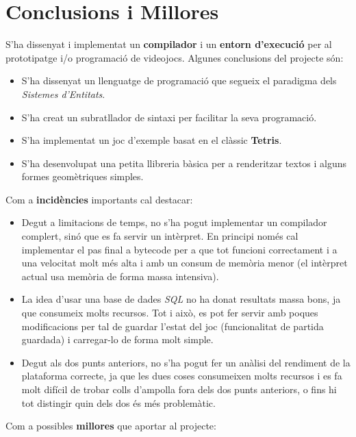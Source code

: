 \chapter{Conclusions i Millores}

S'ha dissenyat i implementat un {\bf compilador} i un {\bf entorn d'execució} per al prototipatge i/o programació de videojocs. Algunes conclusions del projecte són:

\begin{itemize}
  \item S'ha dissenyat un llenguatge de programació que segueix el paradigma dels {\em Sistemes d'Entitats}.
  \item S'ha creat un subratllador de sintaxi per facilitar la seva programació.
  \item S'ha implementat un joc d'exemple basat en el clàssic {\bf Tetris}.
  \item S'ha desenvolupat una petita llibreria bàsica per a renderitzar textos i alguns formes geomètriques simples.
\end{itemize}

Com a {\bf incidències} importants cal destacar:

\begin{itemize}
  \item Degut a limitacions de temps, no s'ha pogut implementar un compilador complert, sinó que es fa servir un intèrpret. En principi només cal implementar el pas final a bytecode per a que tot funcioni correctament i a una velocitat molt més alta i amb un consum de memòria menor (el intèrpret actual usa memòria de forma massa intensiva).
  \item La idea d'usar una base de dades {\em SQL} no ha donat resultats massa bons, ja que consumeix molts recursos. Tot i això, es pot fer servir amb poques modificacions per tal de guardar l'estat del joc (funcionalitat de partida guardada) i carregar-lo de forma molt simple.
  \item Degut als dos punts anteriors, no s'ha pogut fer un anàlisi del rendiment de la plataforma correcte, ja que les dues coses consumeixen molts recursos i es fa molt difícil de trobar colls d'ampolla fora dels dos punts anteriors, o fins hi tot distingir quin dels dos és més problemàtic.
\end{itemize}

Com a possibles {\bf millores} que aportar al projecte:

